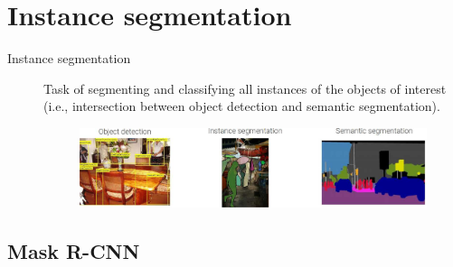 \section{Instance segmentation}

\begin{description}
    \item[Instance segmentation] 
        Task of segmenting and classifying all instances of the objects of interest (i.e., intersection between object detection and semantic segmentation).

        \begin{figure}[H]
            \centering
            \includegraphics[width=0.7\linewidth]{./img/obj_detection_and_segmentation.jpg}
        \end{figure}
\end{description}


\subsection{Mask R-CNN}

